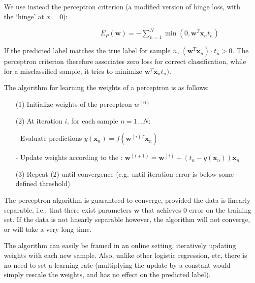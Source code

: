 \documentclass{article} %
\begin{document}
We use instead the perceptron criterion (a modified version of hinge loss, with the `hinge' at $x=0$):

{$\qquad \qquad \qquad \qquad \qquad \qquad \qquad E_P(\bm{w}) = -\sum\limits_{n=1}^N \min(0, \bm{w}^T\bm{x}_nt_n) $}

If the predicted label matches the true label for sample $n$, $(\bm{w}^T\bm{x}_n)\cdot t_n > 0$. The perceptron criterion therefore
associates zero loss for correct classification, while for a misclassified sample, it tries to minimize $\bm{w}^T\bm{x}_nt_n)$.

The algorithm for learning the weights of a perceptron is as follows:
\begin{enumerate}

\item[(1)] Initialize weights of the perceptron $w^{(0)}$

\item[(2)] At iteration $i$, for each sample $n = 1...N$: 

- Evaluate predictions $y(\bm{x}_n) = f(\bm{w}^{(i)T}\bm{x}_n)$

- Update weights according to the :
$ \bm{w}^{(i+1)} = \bm{w}^{(i)} + (t_n - y(\bm{x}_n))\bm{x}_n $

\item[(3)] Repeat (2) until convergence (e.g. until iteration error is below some defined threshold)

\end{enumerate}


The perceptron algorithm is guaranteed to converge, provided the data is linearly separable, i.e., that there exist parameters $\bm{w}$ that achieves 0 error on the training set. If the data is not linearly separable however, the algorithm will not converge, or will take a very long time. 

The algorithm can easily be framed in an online setting, iteratively updating weights with each new sample. Also, unlike other logistic regression, etc, there is no need to set a learning rate (multiplying the update by a constant would simply rescale the weights, and has no effect on the predicted label).
\end{document}
